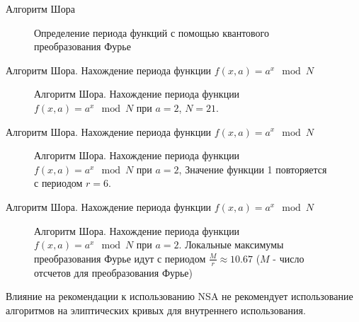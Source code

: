 \documentclass[10pt,pdf,hyperref={unicode}]{beamer}
\begin{document}
\begin{frame}{Алгоритм Шора}
\begin{figure}
\centering

\scalebox{.5}{}

\caption{ Определение периода функций с помощью квантового
  преобразования Фурье}
\end{figure}
\end{frame}


\begin{frame}{Алгоритм Шора. Нахождение периода функции 
  $f\left(x, a\right) = a^x \mod{N}$}
\begin{figure}
\centering

\scalebox{.5}{}

\caption{Алгоритм Шора. Нахождение периода функции 
  $f\left(x, a\right) = a^x \mod{N}$ при $a=2$, $N = 21$.}
\end{figure}
\end{frame}

\begin{frame}{Алгоритм Шора. Нахождение периода функции 
  $f\left(x, a\right) = a^x \mod{N}$}
\begin{figure}
\centering

\scalebox{.5}{}

\caption{Алгоритм Шора. Нахождение периода функции 
  $f\left(x, a\right) = a^x \mod{N}$ при $a=2$,  
  Значение функции 1 повторяется с периодом $r=6$.}
\end{figure}
\end{frame}

\begin{frame}{Алгоритм Шора. Нахождение периода функции 
  $f\left(x, a\right) = a^x \mod{N}$}
\begin{figure}
\centering

\scalebox{.5}{}

\caption{Алгоритм Шора. Нахождение периода функции 
  $f\left(x, a\right) = a^x \mod{N}$ при $a=2$. 
  Локальные максимумы преобразования Фурье 
  идут с периодом $\frac{M}{r} \approx 10.67$ ($M$ - число отсчетов
  для преобразования Фурье)}
\end{figure}
\end{frame}


\begin{frame}{Влияние на рекомендации к использованию}
NSA не рекомендует использование алгоритмов на элиптических кривых для
внутреннего использования.
\end{frame}
\end{document}
